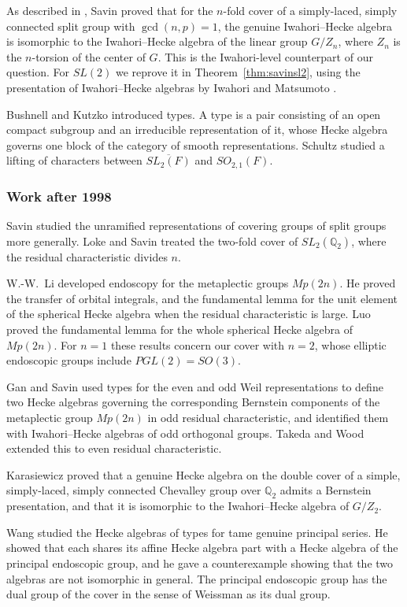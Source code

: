 \documentclass[12pt,letterpaper]{amsart}
\numberwithin{equation}{section}
\theoremstyle{definition}
\theoremstyle{remark}
\begin{document}
As described in \cite{Ka21}, Savin \cite{Sa88} proved that for the
$n$-fold cover of a
simply-laced, simply connected split group with $\gcd(n,p)=1$, the
genuine Iwahori--Hecke algebra is isomorphic to the Iwahori--Hecke
algebra of the linear group $G/Z_n$, where $Z_n$ is the $n$-torsion of
the center of $G$. This is the Iwahori-level counterpart of our
question. For $SL(2)$ we reprove it in Theorem~\ref{thm:savinsl2},
using the presentation of Iwahori--Hecke algebras by Iwahori and
Matsumoto \cite{IM65}.

Bushnell and Kutzko \cite{BK98} introduced types. A type is a pair
consisting of an open compact subgroup and an irreducible
representation of it, whose Hecke algebra governs one block of the
category of smooth representations. Schultz \cite{Sc98} studied a
lifting of characters between $\overline{SL_2(F)}$ and $SO_{2,1}(F)$.

\subsubsection{Work after 1998}
Savin \cite{Sa04} studied the unramified representations of covering
groups of split groups more generally. Loke and Savin \cite{LS10}
treated the two-fold cover of $SL_2(\mathbb{Q}_2)$, where the residual
characteristic divides $n$.

W.-W.~Li \cite{Li11} developed endoscopy for the metaplectic groups
$Mp(2n)$. He proved the transfer of orbital integrals, and the
fundamental lemma for the unit element of the spherical Hecke algebra
when the residual characteristic is large. Luo \cite{Lu18} proved the
fundamental lemma for the whole spherical Hecke algebra of $Mp(2n)$.
For $n=1$ these results concern our cover with $n=2$, whose elliptic
endoscopic groups include $PGL(2)=SO(3)$.

Gan and Savin \cite{GS12} used types for the even and odd Weil
representations to define two Hecke algebras governing the
corresponding Bernstein components of the metaplectic group $Mp(2n)$
in odd residual characteristic, and identified them with Iwahori--Hecke
algebras of odd orthogonal groups. Takeda and Wood \cite{TW18}
extended this to even residual characteristic.

Karasiewicz \cite{Ka21} proved that a genuine Hecke algebra on the
double cover of a simple, simply-laced, simply connected Chevalley
group over $\mathbb{Q}_2$ admits a Bernstein presentation, and that it
is isomorphic to the Iwahori--Hecke algebra of $G/Z_2$.

Wang \cite{Wa24} studied the Hecke algebras of types for tame genuine
principal series. He showed that each shares its affine Hecke algebra
part with a Hecke algebra of the principal endoscopic group, and he
gave a counterexample showing that the two algebras are not isomorphic
in general. The principal endoscopic group has the dual group of the
cover in the sense of Weissman \cite{We18} as its dual group.
\end{document}
